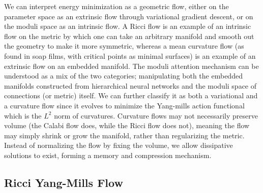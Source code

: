\documentclass{article}
\begin{document}
    We can interpret energy minimization as a geometric flow, either on the parameter space as an extrinsic flow through variational gradient descent, or on the moduli space as an intrinsic flow. A Ricci flow is an example of an intrinsic flow on the metric by which one can take an arbitrary manifold and smooth out the geometry to make it more symmetric, whereas a mean curvature flow (as found in soap films, with critical points as minimal surfaces) is an example of an extrinsic flow on an embedded manifold. The moduli attention mechanism can be understood as a mix of the two categories; manipulating both the embedded manifolds constructed from hierarchical neural networks and the moduli space of connections (or metric) itself. We can further classify it as both a variational and a curvature flow since it evolves to minimize the Yang-mills action functional which is the $L^2$ norm of curvatures. 
    Curvature flows may not necessarily preserve volume (the Calabi flow does, while the Ricci flow does not), meaning the flow may simply shrink or grow the manifold, rather than regularizing the metric. Instead of normalizing the flow by fixing the volume, we allow dissipative solutions to exist, forming a memory and compression mechanism. 

    \subsection{Ricci Yang-Mills Flow}
    
\end{document}
